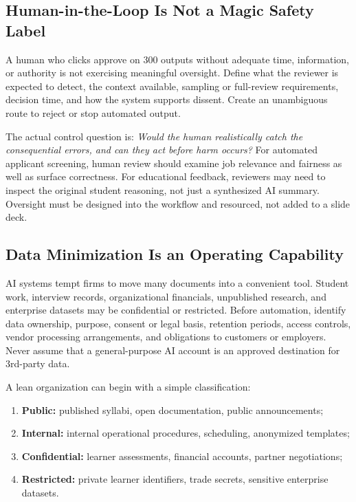 \subsection{Human-in-the-Loop Is Not a Magic Safety Label}
\label{sec:human_in_the_loop_reality}

A human who clicks approve on 300 outputs without adequate time, information, or authority is not exercising meaningful oversight. Define what the reviewer is expected to detect, the context available, sampling or full-review requirements, decision time, and how the system supports dissent. Create an unambiguous route to reject or stop automated output.

The actual control question is: \textit{Would the human realistically catch the consequential errors, and can they act before harm occurs?} For automated applicant screening, human review should examine job relevance and fairness as well as surface correctness. For educational feedback, reviewers may need to inspect the original student reasoning, not just a synthesized AI summary. Oversight must be designed into the workflow and resourced, not added to a slide deck.

\subsection{Data Minimization Is an Operating Capability}
\label{sec:data_minimization}

AI systems tempt firms to move many documents into a convenient tool. Student work, interview records, organizational financials, unpublished research, and enterprise datasets may be confidential or restricted. Before automation, identify data ownership, purpose, consent or legal basis, retention periods, access controls, vendor processing arrangements, and obligations to customers or employers. Never assume that a general-purpose AI account is an approved destination for 3rd-party data.

A lean organization can begin with a simple classification:
\begin{enumerate}
    \item \textbf{Public:} published syllabi, open documentation, public announcements;
    \item \textbf{Internal:} internal operational procedures, scheduling, anonymized templates;
    \item \textbf{Confidential:} learner assessments, financial accounts, partner negotiations;
    \item \textbf{Restricted:} private learner identifiers, trade secrets, sensitive enterprise datasets.
\end{enumerate}

